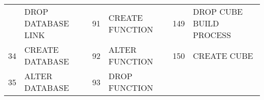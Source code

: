 \begin{longtable}[]{@{}llllll@{}}
\begin{minipage}[t]{0.06\columnwidth}
\end{minipage} & \begin{minipage}[t]{0.19\columnwidth}\raggedright\strut
DROP DATABASE LINK\strut
\end{minipage} & \begin{minipage}[t]{0.06\columnwidth}\raggedright\strut
91\strut
\end{minipage} & \begin{minipage}[t]{0.24\columnwidth}\raggedright\strut
CREATE FUNCTION\strut
\end{minipage} & \begin{minipage}[t]{0.06\columnwidth}\raggedright\strut
149\strut
\end{minipage} & \begin{minipage}[t]{0.24\columnwidth}\raggedright\strut
DROP CUBE BUILD PROCESS\strut
\end{minipage}\tabularnewline
\begin{minipage}[t]{0.06\columnwidth}\raggedright\strut
34\strut
\end{minipage} & \begin{minipage}[t]{0.19\columnwidth}\raggedright\strut
CREATE DATABASE\strut
\end{minipage} & \begin{minipage}[t]{0.06\columnwidth}\raggedright\strut
92\strut
\end{minipage} & \begin{minipage}[t]{0.24\columnwidth}\raggedright\strut
ALTER FUNCTION\strut
\end{minipage} & \begin{minipage}[t]{0.06\columnwidth}\raggedright\strut
150\strut
\end{minipage} & \begin{minipage}[t]{0.24\columnwidth}\raggedright\strut
CREATE CUBE\strut
\end{minipage}\tabularnewline
\begin{minipage}[t]{0.06\columnwidth}\raggedright\strut
35\strut
\end{minipage} & \begin{minipage}[t]{0.19\columnwidth}\raggedright\strut
ALTER DATABASE\strut
\end{minipage} & \begin{minipage}[t]{0.06\columnwidth}\raggedright\strut
93\strut
\end{minipage} & \begin{minipage}[t]{0.24\columnwidth}\raggedright\strut
DROP FUNCTION\strut
\end{minipage} & \begin{minipage}[t]{0.06\columnwidth}\raggedright\strut

\end{minipage}
\end{longtable}
